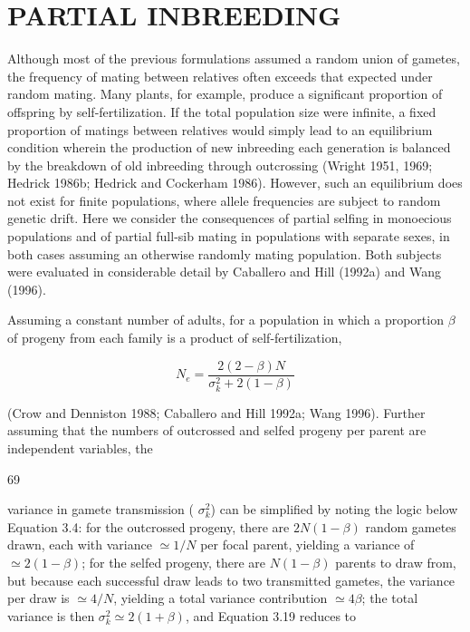 \documentclass{article}
\begin{document}
\section{PARTIAL INBREEDING}
Although most of the previous formulations assumed a random union of gametes, the frequency of mating between relatives often exceeds that expected under random mating. Many plants, for example, produce a significant proportion of offspring by self-fertilization. If the total population size were infinite, a fixed proportion of matings between relatives would simply lead to an equilibrium condition wherein the production of new inbreeding each generation is balanced by the breakdown of old inbreeding through outcrossing (Wright 1951, 1969; Hedrick 1986b; Hedrick and Cockerham 1986). However, such an equilibrium does not exist for finite populations, where allele frequencies are subject to random genetic drift. Here we consider the consequences of partial selfing in monoecious populations and of partial full-sib mating in populations with separate sexes, in both cases assuming an otherwise randomly mating population. Both subjects were evaluated in considerable detail by Caballero and Hill (1992a) and Wang (1996).

Assuming a constant number of adults, for a population in which a proportion  $ \beta $ of progeny from each family is a product of self-fertilization,

\begin{equation}
N_{e}=\frac{2(2-\beta)N}{\sigma_{k}^{2}+2(1-\beta)}
\tag{3.19}
\label{eq:3_19}
\end{equation}

(Crow and Denniston 1988; Caballero and Hill 1992a; Wang 1996). Further assuming that the numbers of outcrossed and selfed progeny per parent are independent variables, the

69

variance in gamete transmission ( $ \sigma_k^2 $) can be simplified by noting the logic below Equation 3.4: for the outcrossed progeny, there are  $ 2N(1 - \beta) $ random gametes drawn, each with variance  $ \simeq 1/N $ per focal parent, yielding a variance of  $ \simeq 2(1 - \beta) $; for the selfed progeny, there are  $ N(1 - \beta) $ parents to draw from, but because each successful draw leads to two transmitted gametes, the variance per draw is  $ \simeq 4/N $, yielding a total variance contribution  $ \simeq 4\beta $; the total variance is then  $ \sigma_k^2 \simeq 2(1 + \beta) $, and Equation 3.19 reduces to
\end{document}
